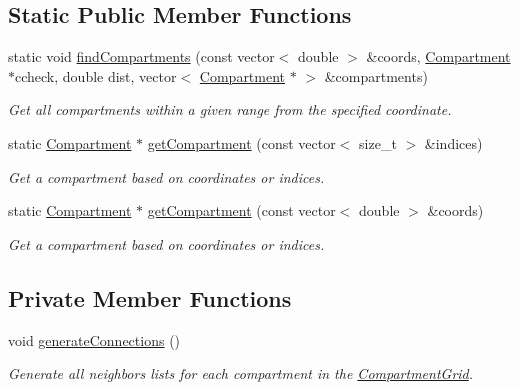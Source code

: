 \subsection*{Static Public Member Functions}
\begin{DoxyCompactItemize}
\item 
static void \hyperlink{classGController_a3217b2c56180064a0efda25e79bd6267}{find\+Compartments} (const vector$<$ double $>$ \&coords, \hyperlink{classCompartment}{Compartment} $\ast$ccheck, double dist, vector$<$ \hyperlink{classCompartment}{Compartment} $\ast$ $>$ \&compartments)
\begin{DoxyCompactList}\small\item\em Get all compartments within a given range from the specified coordinate. \end{DoxyCompactList}\end{DoxyCompactItemize}
{\bf }\par
\begin{DoxyCompactItemize}
\item 
static \hyperlink{classCompartment}{Compartment} $\ast$ \hyperlink{classGController_aec4700bedd12cf8d83c0ffa2c3f49891}{get\+Compartment} (const vector$<$ size\+\_\+t $>$ \&indices)
\begin{DoxyCompactList}\small\item\em Get a compartment based on coordinates or indices. \end{DoxyCompactList}\item 
static \hyperlink{classCompartment}{Compartment} $\ast$ \hyperlink{classGController_af4a3bd7c2e4868529860c58e125f6447}{get\+Compartment} (const vector$<$ double $>$ \&coords)
\begin{DoxyCompactList}\small\item\em Get a compartment based on coordinates or indices. \end{DoxyCompactList}\end{DoxyCompactItemize}

\subsection*{Private Member Functions}
\begin{DoxyCompactItemize}
\item 
void \hyperlink{classGController_a94281778427606e93a54c67ab288e2cc}{generate\+Connections} ()
\begin{DoxyCompactList}\small\item\em Generate all neighbors lists for each compartment in the \hyperlink{classCompartmentGrid}{Compartment\+Grid}. \end{DoxyCompactList}\end{DoxyCompactItemize}
